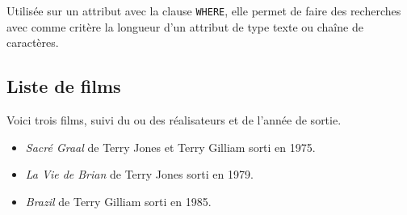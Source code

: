 Utilisée sur un attribut avec la clause \verb|WHERE|, elle permet de faire des recherches avec comme critère la longueur d'un attribut de type texte ou chaîne de caractères.

\subsection{Liste de films}
Voici trois films, suivi du ou des réalisateurs et de l'année de sortie.

\begin{itemize}
 \item \textit{Sacré Graal} de Terry Jones et Terry Gilliam sorti en 1975.
 \item \textit{La Vie de Brian} de Terry Jones sorti en 1979.
 \item \textit{Brazil} de Terry Gilliam sorti en 1985.
\end{itemize}


